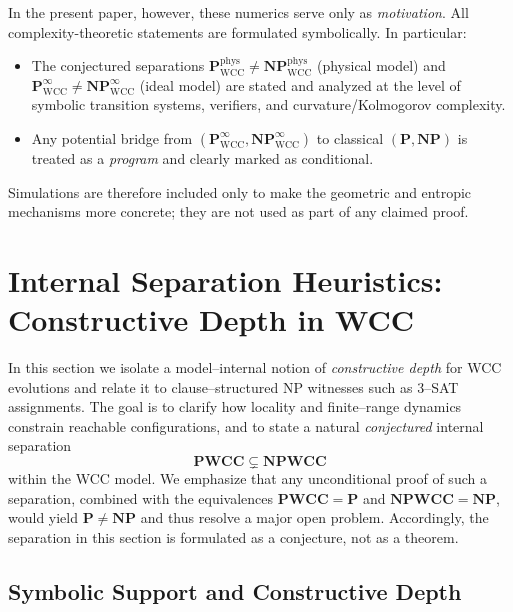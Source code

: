 \documentclass[12pt]{article}
\renewcommand{\P}{\mathbf{P}}
\newcommand{\NP}{\mathbf{NP}}
\newcommand{\PWCC}{\mathbf{PWCC}}
\newcommand{\NPWCC}{\mathbf{NPWCC}}
\theoremstyle{remark}
\begin{document}
In the present paper, however, these numerics serve only as \emph{motivation}.
All complexity-theoretic statements are formulated symbolically. In particular:

\begin{itemize}
  \item The conjectured separations
        \( \mathbf{P}_{\mathrm{WCC}}^{\mathrm{phys}} \neq
           \mathbf{NP}_{\mathrm{WCC}}^{\mathrm{phys}} \) (physical model)
        and \( \mathbf{P}_{\mathrm{WCC}}^{\infty} \neq
               \mathbf{NP}_{\mathrm{WCC}}^{\infty} \) (ideal model)
        are stated and analyzed at the level of symbolic transition systems,
        verifiers, and curvature/Kolmogorov complexity.
  \item Any potential bridge from
        \( (\mathbf{P}_{\mathrm{WCC}}^{\infty},\mathbf{NP}_{\mathrm{WCC}}^{\infty}) \)
        to classical \( (\mathbf{P},\mathbf{NP}) \) is treated as a \emph{program}
        and clearly marked as conditional.
\end{itemize}

Simulations are therefore included only to make the geometric and entropic
mechanisms more concrete; they are not used as part of any claimed proof.





\section{Internal Separation Heuristics: Constructive Depth in WCC}
\label{sec:internal_separation}

In this section we isolate a model–internal notion of \emph{constructive depth}
for WCC evolutions and relate it to clause–structured NP witnesses such as
3–SAT assignments. The goal is to clarify how locality and finite–range
dynamics constrain reachable configurations, and to state a natural
\emph{conjectured} internal separation
\[
\PWCC \subsetneq \NPWCC
\]
within the WCC model. We emphasize that any unconditional proof of such a
separation, combined with the equivalences $\PWCC = \P$ and
$\NPWCC = \NP$, would yield $\P \neq \NP$ and thus resolve a major open
problem. Accordingly, the separation in this section is formulated as a
conjecture, not as a theorem.

\subsection{Symbolic Support and Constructive Depth}
\end{document}

